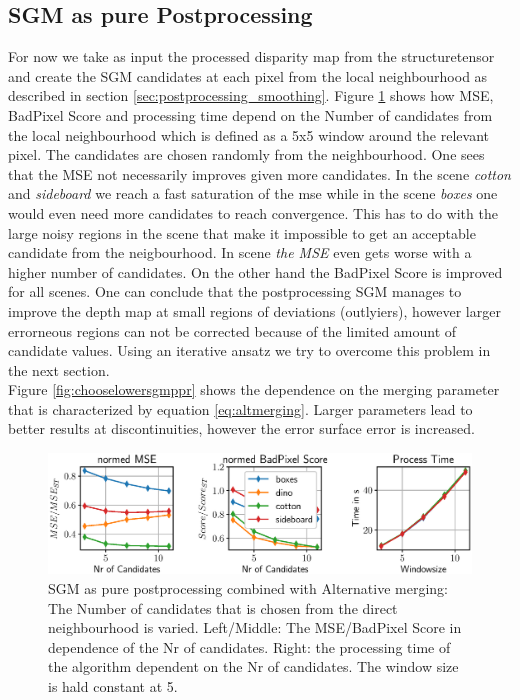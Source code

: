 \documentclass  [
  paper    = a4,
  BCOR     = 10mm,
  twoside,
  fontsize = 12pt,
  fleqn,
  toc      = bibnumbered,
  toc      = listofnumbered,
  numbers  = noendperiod,
  headings = normal,
  listof   = leveldown,
  version  = 3.03
]                                       {scrreprt}
\begin{document}
\subsection*{SGM as pure Postprocessing}
\label{sec:sgmppr_ev}

For now we take as input the processed disparity map from the structuretensor and create the SGM candidates at each pixel from the local neighbourhood as described in section \ref{sec:postprocessing_smoothing}. Figure \ref{fig:chooselowersgmpprwindowsize5} shows how MSE, BadPixel Score and processing time depend on the Number of candidates from the local neighbourhood which is defined as a 5x5 window around the relevant pixel. The candidates are chosen randomly from the neighbourhood. One sees that the MSE not necessarily improves given more candidates. In the scene \textit{cotton} and \textit{sideboard} we reach a fast saturation of the mse while in the scene \textit{boxes} one would even need more candidates to reach convergence. This has to do with the large noisy regions in the scene that make it impossible to get an acceptable candidate from the neigbourhood. In scene \textit{the MSE} even gets worse with a higher number of candidates. On the other hand the BadPixel Score is improved for all scenes. One can conclude that the postprocessing SGM manages to improve the depth map at small regions of deviations (outlyiers), however larger errorneous regions can not be corrected because of the limited amount of candidate values. Using an iterative ansatz we try to overcome this problem in the next section.\\
 
Figure \ref{fig:chooselowersgmppr} shows the dependence on the merging parameter that is characterized by equation \ref{eq:altmerging}. Larger parameters lead to better results at discontinuities, however the error surface error is increased.
\begin{figure}
	\centering
	\includegraphics[width=01\linewidth]{images/choose_lower_sgm_ppr_windowsize_5}
	\caption[SGM as pure postprocessing combined with Alternative merging parameter dependence]{SGM as pure postprocessing combined with Alternative merging: The Number of candidates that is chosen from the direct neighbourhood is varied. Left/Middle: The MSE/BadPixel Score in dependence of the Nr of candidates. Right: the processing time of the algorithm dependent on the Nr of candidates. The window size is hald constant at 5.}
	\label{fig:chooselowersgmpprwindowsize5}
\end{figure}
\end{document}
